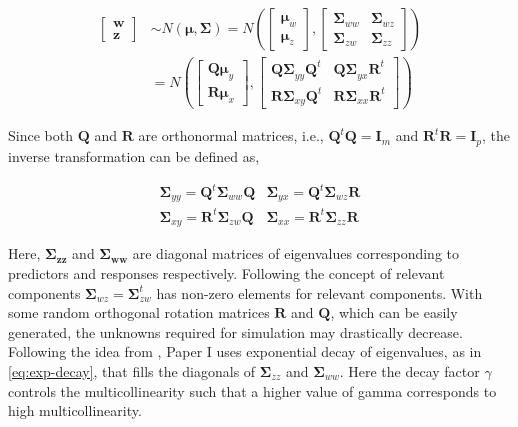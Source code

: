 \documentclass[11pt,twoside,openright,titlepage,
  headinclude,footinclude,BCOR=5mm,
  numbers=noenddot,cleardoublepage=empty,
  tablecaptionabove, dottedtoc,
  bibliography=totoc,paper=a4]{scrreprt}
\begin{document}
\begin{align}
  \begin{bmatrix}\mathbf{w} \\
  \mathbf{z}\end{bmatrix}  & \sim N \left(\boldsymbol{\mu}, \boldsymbol{\Sigma}\right)
  = N \left(
    \begin{bmatrix}
      \boldsymbol{\mu}_w \\ \boldsymbol{\mu}_z
    \end{bmatrix},
    \begin{bmatrix}
      \boldsymbol{\Sigma}_{ww} & \boldsymbol{\Sigma}_{wz} \\
      \boldsymbol{\Sigma}_{zw} & \boldsymbol{\Sigma}_{zz}
    \end{bmatrix} \right) \nonumber \\
  &= N \left(
    \begin{bmatrix}
      \boldsymbol{Q\mu}_y \\
      \boldsymbol{R\mu}_x
    \end{bmatrix},
    \begin{bmatrix}
      \boldsymbol{Q\Sigma}_{yy}\boldsymbol{Q}^t & \boldsymbol{Q\Sigma}_{yx}\mathbf{R}^t \\
      \boldsymbol{R\Sigma}_{xy}\boldsymbol{Q}^t & \boldsymbol{R\Sigma}_{xx}\mathbf{R}^t
    \end{bmatrix}
  \right)
  \label{eq:latent-model}
\end{align}

Since both \(\mathbf{Q}\) and \(\mathbf{R}\) are orthonormal matrices, i.e., \(\mathbf{Q}^t\mathbf{Q} = \mathbf{I}_m\) and \(\mathbf{R}^t\mathbf{R} = \mathbf{I}_p\), the inverse transformation can be defined as,

\begin{equation}
  \begin{matrix}
    \boldsymbol{\Sigma}_{yy} = \mathbf{Q}^t \boldsymbol{\Sigma}_{ww} \mathbf{Q} &
    \boldsymbol{\Sigma}_{yx} = \mathbf{Q}^t \boldsymbol{\Sigma}_{wz} \mathbf{R} \\
    \boldsymbol{\Sigma}_{xy} = \mathbf{R}^t \boldsymbol{\Sigma}_{zw} \mathbf{Q} &
    \boldsymbol{\Sigma}_{xx} = \mathbf{R}^t \boldsymbol{\Sigma}_{zz} \mathbf{R}
  \end{matrix}
  \label{eq:cov-yx-wz}
\end{equation}

Here, \(\boldsymbol{\Sigma_{zz}}\) and \(\boldsymbol{\Sigma_{ww}}\) are diagonal matrices of eigenvalues corresponding to predictors and responses respectively. Following the concept of relevant components \(\boldsymbol{\Sigma}_{wz}=\boldsymbol{\Sigma}_{zw}^t\) has non-zero elements for relevant components. With some random orthogonal rotation matrices \(\mathbf{R}\) and \(\mathbf{Q}\), which can be easily generated, the unknowns required for simulation may drastically decrease. Following the idea from \citet{saebo2015simrel}, Paper I uses exponential decay of eigenvalues, as in \eqref{eq:exp-decay}, that fills the diagonals of \(\boldsymbol{\Sigma}_{zz}\) and \(\boldsymbol{\Sigma}_{ww}\). Here the decay factor \(\gamma\) controls the multicollinearity such that a higher value of gamma corresponds to high multicollinearity.
\end{document}
